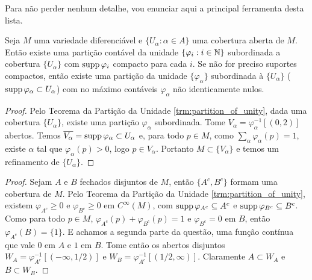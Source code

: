Para não perder nenhum detalhe, vou enunciar aqui a principal ferramenta desta lista.
\begin{theorem}
    \label{trm:partition_of_unity}
    Seja $M$ uma variedade diferenciável e $\{U_\alpha: \alpha \in A\}$ uma cobertura aberta de $M$. Então existe uma partição contável da unidade
    $\{\varphi_i : i \in \mathbb{N}\}$ subordinada a cobertura $\{U_\alpha\}$ com $\operatorname{supp} \varphi_i$ compacto para cada $i$. Se não for preciso suportes compactos,
    então existe uma partição da unidade $\{\varphi_\alpha\}$ subordinada à $\{U_\alpha\}$ ($\operatorname{supp} \varphi_\alpha \subset U_\alpha$) com no máximo
    contáveis $\varphi_\alpha$ não identicamente nulos.
\end{theorem}

\begin{problem}
\label{prob:l1:2}   
\end{problem}

\begin{proof}
    Pelo Teorema da Partição da Unidade \ref{trm:partition_of_unity}, dada uma cobertura $\{U_\alpha\}$, existe uma partição $\varphi_\alpha$ subordinada.
    Tome $V_\alpha = \varphi_\alpha^{-1}[(0,2)]$ abertos. Temos $\overline{V_\alpha} = \operatorname{supp} \varphi_\alpha \subset U_\alpha$ e, para todo $p \in M$, como $\sum_\alpha \varphi_\alpha(p) = 1$,
    existe $\alpha$ tal que $\varphi_\alpha(p) > 0$, logo $p \in V_\alpha$. Portanto $M \subset \{V_\alpha\}$ e temos um refinamento de $\{U_\alpha\}$.
\end{proof}

\begin{problem}
\label{prob:l1:3}   
\end{problem}

\begin{proof}
    Sejam $A$ e $B$ fechados disjuntos de $M$, então $\{A^c, B^c\}$ formam uma cobertura de $M$. Pelo Teorema da Partição da Unidade \ref{trm:partition_of_unity}, existem
    $\varphi_{A^c} \geq 0$ e $\varphi_{B^c} \geq 0$ em $C^\infty(M)$, com $\operatorname{supp} \varphi_{A^c} \subseteq A^c$ e  $\operatorname{supp} \varphi_{B^c} \subseteq B^c$. Como para todo $p \in M$, $\varphi_{A^c}(p) + \varphi_{B^c}(p) = 1$
    e $\varphi_{B^c} = 0$ em $B$, então $\varphi_{A^c}(B) = \{1\}$. E achamos a segunda parte da questão, uma função contínua que vale $0$ em $A$ e $1$ em $B$.
    Tome então os abertos disjuntos $W_A = \varphi_{A^c}^{-1}[(-\infty,1/2)]$ e $W_B =\varphi_{A^c}^{-1}[(1/2,\infty)]$. Claramente $A \subset W_A$ e $B \subset W_B$.
\end{proof}

\begin{problem}
\label{prob:l1:4}   
\end{problem}
